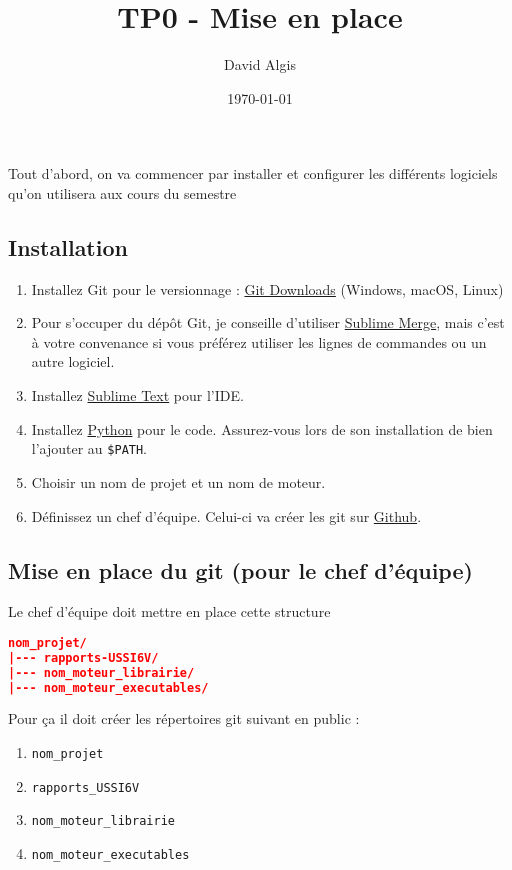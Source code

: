 \documentclass[a4paper,12pt]{article}
\title{TP0 - Mise en place}
\author{David Algis}
\date{\today}
\begin{document}
\maketitle


Tout d'abord, on va commencer par installer et configurer les différents logiciels qu'on utilisera aux cours du semestre

\subsection{Installation}

\begin{enumerate}
    \item Installez Git pour le versionnage : \href{https://git-scm.com/downloads}{Git Downloads} (Windows, macOS, Linux)
    \item Pour s'occuper du dépôt Git, je conseille d'utiliser \href{https://www.sublimemerge.com/}{Sublime Merge}, mais c'est à votre convenance si vous préférez utiliser les lignes de commandes ou un autre logiciel.
    \item Installez \href{https://www.sublimetext.com/}{Sublime Text} pour l'IDE. 
    \item Installez \href{https://www.python.org/downloads/}{Python} pour le code. Assurez-vous lors de son installation de bien l'ajouter au \texttt{\$PATH}.
    \item Choisir un nom de projet et un nom de moteur. 
    \item Définissez un chef d'équipe. Celui-ci va créer les git sur \href{https://github.com/}{Github}. 
\end{enumerate}

\subsection{Mise en place du git (pour le chef d'équipe)}

Le chef d'équipe doit mettre en place cette structure
\begin{lstlisting}[language=json]
nom_projet/
|--- rapports-USSI6V/
|--- nom_moteur_librairie/
|--- nom_moteur_executables/
\end{lstlisting}

Pour ça il doit créer les répertoires git suivant en public : 
\begin{enumerate}
    \item \texttt{nom\_projet} 
    \item \texttt{rapports\_USSI6V}
    \item \texttt{nom\_moteur\_librairie}
    \item \texttt{nom\_moteur\_executables}
\end{enumerate}
\end{document}
